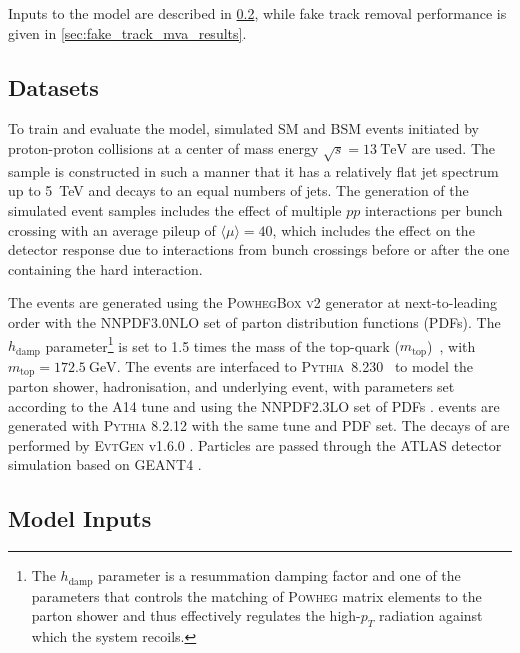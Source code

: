 Inputs to the model are described in \cref{sec:fake_mva_model_inputs}, while fake track removal performance is given in \cref{sec:fake_track_mva_results}.

\subsection{Datasets}\label{sec:track_classifier_datasets}

To train and evaluate the model, simulated SM \ttbar and BSM \Zprime events initiated by proton-proton collisions at a center of mass energy $\sqrt{s} = \SI{13}{\TeV}$ are used.
The \Zprime sample is constructed in such a manner that it has a relatively flat jet \pt spectrum up to \SI{5}{\TeV} and decays to an equal numbers of \bcl jets.
The generation of the simulated event samples includes the effect of multiple $pp$ interactions per bunch crossing with an average pileup of $\langle \mu \rangle = 40$, which includes the effect on the detector response due to interactions from bunch crossings before or after the one containing the hard interaction.

\newcommand{\hdampFootnote}{%
The $h_\text{damp}$ parameter is a resummation damping factor and one of the parameters that controls the matching of \textsc{Powheg} matrix elements to the parton shower and thus effectively regulates the high-$p_T$ radiation against which the \ttbar system recoils.}

The \ttbar events are generated using the \textsc{PowhegBox} \cite{powheg2004, powheg2007, powheg2007_2, powheg2010} \textsc{v2} generator at next-to-leading order with the NNPDF3.0NLO \cite{Ball:2014uwa} set of parton distribution functions (PDFs). The $h_\text{damp}$ parameter\footnote{\hdampFootnote} is set to 1.5 times the mass of the top-quark ($m_\text{top}$)~\cite{ATL-PHYS-PUB-2016-020}, with $m_\text{top} = \SI{172.5}{\GeV}$. 
The events are interfaced to \textsc{Pythia}~8.230~\cite{Sjostrand:2014zea} to model the parton shower, hadronisation, and underlying event, with parameters set according to the A14 tune \cite{ATL-PHYS-PUB-2014-021} and using the NNPDF2.3LO set of PDFs \cite{Ball:2012cx}. 
\Zprime events are generated with \textsc{Pythia} 8.2.12 with the same tune and PDF set.
The decays of \bchadrons are performed by \textsc{EvtGen} v1.6.0 \cite{Lange:2001uf}.
Particles are passed through the ATLAS detector simulation \cite{SOFT-2010-01} based on GEANT4 \cite{Agostinelli:2002hh}.


\subsection{Model Inputs}\label{sec:fake_mva_model_inputs}

